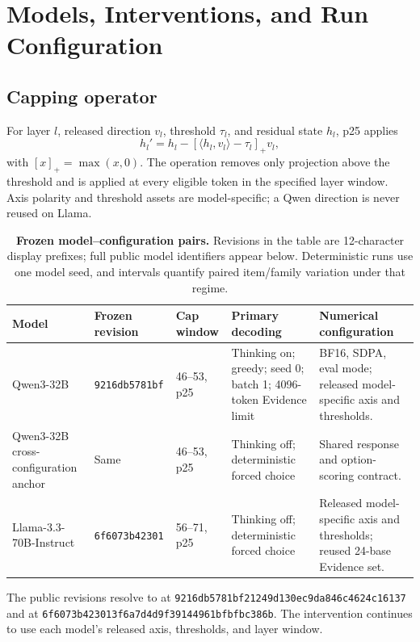\documentclass[letterpaper]{article}
\begin{document}
\section{Models, Interventions, and Run Configuration}
\label{supp:protocols}

\subsection{Capping operator}

For layer $l$, released direction $v_l$, threshold $\tau_l$, and residual state $h_l$, p25 applies
\begin{equation}
h_l' = h_l-\left[\langle h_l,v_l\rangle-\tau_l\right]_+v_l,
\end{equation}
with $[x]_+=\max(x,0)$.  The operation removes only projection above the threshold and is applied at every eligible token in the specified layer window.  Axis polarity and threshold assets are model-specific; a Qwen direction is never reused on Llama.

\begin{table}[t]
\centering
\scriptsize
\setlength{\tabcolsep}{3pt}
\renewcommand{\arraystretch}{1.12}
\begin{tabularx}{\textwidth}{@{}L{2.25cm}L{2.15cm}L{1.75cm}L{3.15cm}Y@{}}
\toprule
Model & Frozen revision & Cap window & Primary decoding & Numerical configuration \\
\midrule
Qwen3-32B & \texttt{9216db5781bf} & 46--53, p25 & Thinking on; greedy; seed 0; batch 1; 4096-token Evidence limit & BF16, SDPA, eval mode; released model-specific axis and thresholds. \\
Qwen3-32B cross-configuration anchor & Same & 46--53, p25 & Thinking off; deterministic forced choice & Shared response and option-scoring contract. \\
Llama-3.3-70B-Instruct & \texttt{6f6073b42301} & 56--71, p25 & Thinking off; deterministic forced choice & Released model-specific axis and thresholds; reused 24-base Evidence set. \\
\bottomrule
\end{tabularx}
\caption{\textbf{Frozen model--configuration pairs.} Revisions in the table are 12-character display prefixes; full public model identifiers appear below. Deterministic runs use one model seed, and intervals quantify paired item/family variation under that regime.}
\label{tab:supp-models}
\end{table}

The public revisions resolve to  at \texttt{9216db57\allowbreak{}81bf2124\allowbreak{}9d130ec9\allowbreak{}da846c46\allowbreak{}24c16137} and  at \texttt{6f6073b4\allowbreak{}23013f6a\allowbreak{}7d4d9f39\allowbreak{}144961bf\allowbreak{}bfbc386b}.  The intervention continues to use each model's released axis, thresholds, and layer window.
\end{document}
